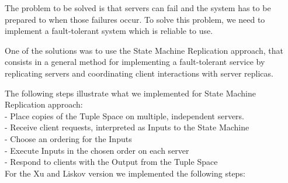 \documentclass[times, 10pt,two column]{article}
\begin{document}


The problem to be solved is that servers can fail and the system has to be prepared  to when those failures occur. To solve this problem, we need to implement a fault-tolerant system which is reliable to use.

One of the solutions was to use the State Machine Replication approach, that consists in a general method for implementing a fault-tolerant service by replicating servers and coordinating client interactions with server replicas.

The following steps illustrate what we implemented for State Machine Replication approach:\\
 - Place copies of the Tuple Space on multiple, independent servers.\\
 - Receive client requests, interpreted as Inputs to the State Machine\\
 - Choose an ordering for the Inputs\\
 - Execute Inputs in the chosen order on each server\\
 - Respond to clients with the Output from the Tuple Space\\
 
 
 For the Xu and Liskov version we implemented the following steps:
 
\end{document}
